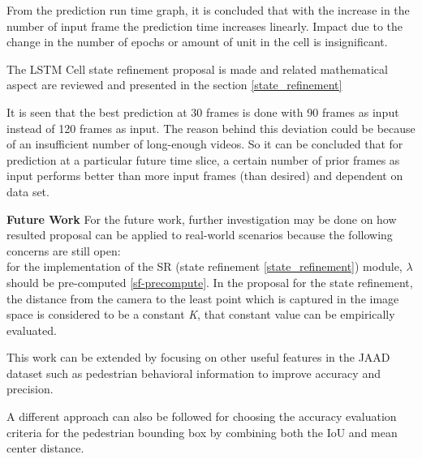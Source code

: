 From the prediction run time graph, it is concluded that with the increase in the number of input frame the prediction time increases linearly. Impact due to the change in the number of epochs or amount of unit in the cell is insignificant.

The LSTM Cell state refinement proposal is made and related mathematical aspect are reviewed and presented in the section \ref{state_refinement}

It is seen that the best prediction at 30 frames is done with 90 frames as input instead of 120 frames as input. The reason behind this deviation could be because of an insufficient number of long-enough videos. So it can be concluded that for prediction at a particular future time slice, a certain number of prior frames as input performs better than more input frames (than desired) and dependent on data set.

\newpara

\textbf{Future Work}
For the future work, further investigation may be done on how resulted proposal can be applied to real-world scenarios because the following concerns are still open: \\
for the implementation of the SR (state refinement \ref{state_refinement}) module, $\lambda$ should be pre-computed \ref{sf-precompute}. In the proposal for the state refinement, the distance from the camera to the least point which is captured in the image space is considered to be a constant \textit{K}, that constant value can be empirically evaluated.

This work can be extended by focusing on other useful features in the JAAD dataset such as pedestrian behavioral information to improve accuracy and precision.

A different approach can also be followed for choosing the accuracy evaluation criteria for the pedestrian bounding box by combining both the IoU and mean center distance.
